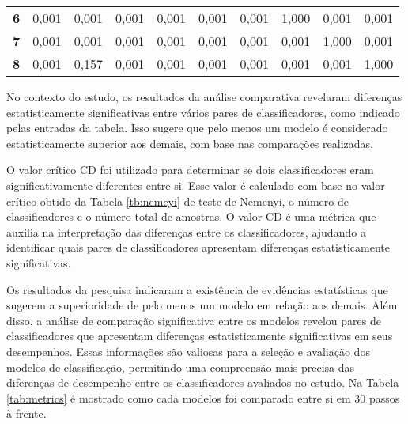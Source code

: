 \begin{table}[H]
\begin{tabular}{@{}clllllllll@{}}
		\textbf{6}                           & 0,001                          & 0,001                          & 0,001                          & 0,001                          & 0,001                          & 0,001                          & 1,000                          & 0,001                          & 0,001                          \\
		\textbf{7}                           & 0,001                          & 0,001                          & 0,001                          & 0,001                          & 0,001                          & 0,001                          & 0,001                          & 1,000                          & 0,001                          \\
		\textbf{8}                           & 0,001                          & 0,157                          & 0,001                          & 0,001                          & 0,001                          & 0,001                          & 0,001                          & 0,001                          & 1,000                          \\ \bottomrule
	\end{tabular}
	

\end{table}


No contexto do estudo, os resultados da análise comparativa revelaram diferenças estatisticamente significativas entre vários pares de classificadores, como indicado pelas entradas da tabela. Isso sugere que pelo menos um modelo é considerado estatisticamente superior aos demais, com base nas comparações realizadas.

O valor crítico CD foi utilizado para determinar se dois classificadores eram significativamente diferentes entre si. Esse valor é calculado com base no valor crítico obtido da Tabela \ref{tb:nemeyi} de teste de Nemenyi, o número de classificadores e o número total de amostras. O valor CD é uma métrica que auxilia na interpretação das diferenças entre os classificadores, ajudando a identificar quais pares de classificadores apresentam diferenças estatisticamente significativas.

Os resultados da pesquisa indicaram a existência de evidências estatísticas que sugerem a superioridade de pelo menos um modelo em relação aos demais. Além disso, a análise de comparação significativa entre os modelos revelou pares de classificadores que apresentam diferenças estatisticamente significativas em seus desempenhos. Essas informações são valiosas para a seleção e avaliação dos modelos de classificação, permitindo uma compreensão mais precisa das diferenças de desempenho entre os classificadores avaliados no estudo. Na Tabela \ref{tab:metrics} é mostrado como cada modelos foi comparado entre si em 30 passos à frente.

